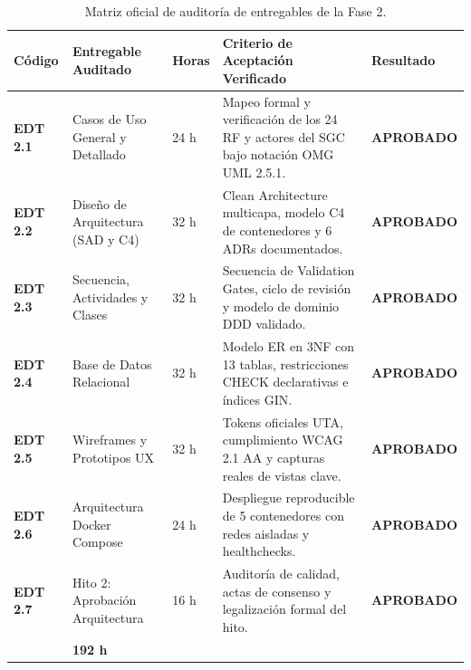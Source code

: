 \documentclass[12pt,a4paper]{article}
\begin{document}
\begin{table}[H]
\centering
\small
\renewcommand{\arraystretch}{1.2}
\begin{tabularx}{\textwidth}{|>{\hsize=0.55\hsize\centering\arraybackslash\bfseries\footnotesize}X|>{\hsize=1.15\hsize\raggedright\arraybackslash\footnotesize}X|>{\hsize=0.50\hsize\centering\arraybackslash\footnotesize}X|>{\hsize=2.10\hsize\raggedright\arraybackslash\footnotesize}X|>{\hsize=0.70\hsize\centering\arraybackslash\footnotesize}X|}
\hline
\rowcolor{tableheader}
\textbf{Código} & \textbf{Entregable Auditado} & \textbf{Horas} & \textbf{Criterio de Aceptación Verificado} & \textbf{Resultado} \\
\hline
\textbf{EDT 2.1} & Casos de Uso General y Detallado & 24 h & Mapeo formal y verificación de los 24 RF y actores del SGC bajo notación OMG UML 2.5.1. & \textbf{APROBADO} \\
\hline
\textbf{EDT 2.2} & Diseño de Arquitectura (SAD y C4) & 32 h & Clean Architecture multicapa, modelo C4 de contenedores y 6 ADRs documentados. & \textbf{APROBADO} \\
\hline
\textbf{EDT 2.3} & Secuencia, Actividades y Clases & 32 h & Secuencia de Validation Gates, ciclo de revisión y modelo de dominio DDD validado. & \textbf{APROBADO} \\
\hline
\textbf{EDT 2.4} & Base de Datos Relacional & 32 h & Modelo ER en 3NF con 13 tablas, restricciones CHECK declarativas e índices GIN. & \textbf{APROBADO} \\
\hline
\textbf{EDT 2.5} & Wireframes y Prototipos UX & 32 h & Tokens oficiales UTA, cumplimiento WCAG 2.1 AA y capturas reales de vistas clave. & \textbf{APROBADO} \\
\hline
\textbf{EDT 2.6} & Arquitectura Docker Compose & 24 h & Despliegue reproducible de 5 contenedores con redes aisladas y healthchecks. & \textbf{APROBADO} \\
\hline
\textbf{EDT 2.7} & Hito 2: Aprobación Arquitectura & 16 h & Auditoría de calidad, actas de consenso y legalización formal del hito. & \textbf{APROBADO} \\
\hline
\multicolumn{2}{|r|}{\textbf{TOTAL HORAS FASE 2:}} & \textbf{192 h} & \multicolumn{2}{l|}{\textbf{100\% de Objetivos Técnicos Alcanzados}} \\
\hline
\end{tabularx}
\caption{Matriz oficial de auditoría de entregables de la Fase 2.}
\label{tab:auditoria_fase2}
\end{table}
\end{document}
